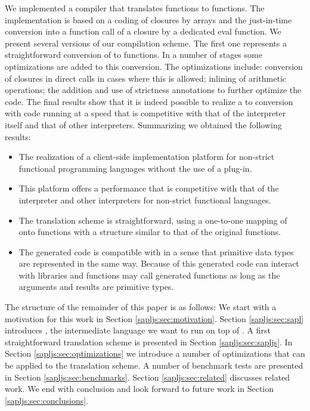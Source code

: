 We implemented a compiler that translates \Sapl functions to \JS functions. 
The implementation is based on a coding of closures by \JS arrays and the just-in-time conversion 
into a \JS function call of a closure by a dedicated \textsf{eval} function.
We present several versions of our compilation scheme. 
The first one represents a straightforward conversion of \Sapl to \JS functions.
In a number of stages some optimizations are added to this conversion.
The optimizations include: conversion of closures in direct calls in cases where this is allowed; inlining of arithmetic operations; the addition  and use
of strictness annotations to further optimize the code.
The final results show that it is indeed possible to realize a \Sapl to \JS conversion with code running at a speed that is competitive with that
of the \Sapl interpreter itself and that of other interpreters.
Summarizing we obtained the following results:
\begin{itemize}
\item The realization of a client-side implementation platform for non-strict functional programming
languages without the use of a plug-in.
\item This platform offers a performance that is competitive with that of the \Sapl interpreter
and other interpreters for non-strict functional languages.
\item The translation scheme is straightforward, using a one-to-one mapping of \Sapl onto \JS
functions with a structure similar to that of the original functions.
\item The generated code is compatible with \JS in a sense that primitive data types are represented in the same way. 
Because of this generated code can interact with  \JS libraries and \JS functions may call generated functions as long as the arguments and results are primitive types.
\end{itemize}
The structure of the remainder of this paper is as follows:
We start with a motivation for this work in Section \ref{sapljs:sec:motivation}.
Section \ref{sapljs:sec:sapl} introduces \Sapl, the intermediate language we want to run on top of \JS.
A first straightforward translation scheme is presented in Section \ref{sapljs:sec:sapljs}.
In Section \ref{sapljs:sec:optimizations} we introduce a number of optimizations that can be applied to the translation scheme.
A number of benchmark tests are presented in Section \ref{sapljs:sec:benchmarks}.
Section \ref{sapljs:sec:related} discusses related work.
We end with conclusion and look forward to future work in Section \ref{sapljs:sec:conclusions}.


